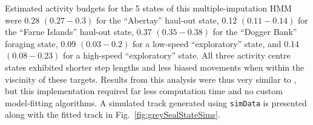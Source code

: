 \documentclass[12pt]{article}\usepackage[]{graphicx}\usepackage[]{color}
\begin{document}
Estimated activity budgets for the 5 states of this multiple-imputation HMM were 0.28 $(0.27-0.3)$ for the ``Abertay'' haul-out state, 0.12 $(0.11-0.14)$ for the ``Farne Islands'' haul-out state, 0.37 $(0.35-0.38)$ for the ``Dogger Bank'' foraging state, 0.09 $(0.03-0.2)$ for a low-speed ``exploratory'' state, and 0.14 $(0.08-0.23)$ for a high-speed ``exploratory'' state. All three activity centre states exhibited shorter step lengths and less biased movements when within the viscinity of these targets. Results from this analysis were thus very similar to \cite{McClintockEtAl2012}, but this implementation required far less computation time and no custom model-fitting algorithms. A simulated track generated using \verb|simData| is presented along with the fitted track in Fig.\ \ref{fig:greySealStateSims}.%
\end{document}
